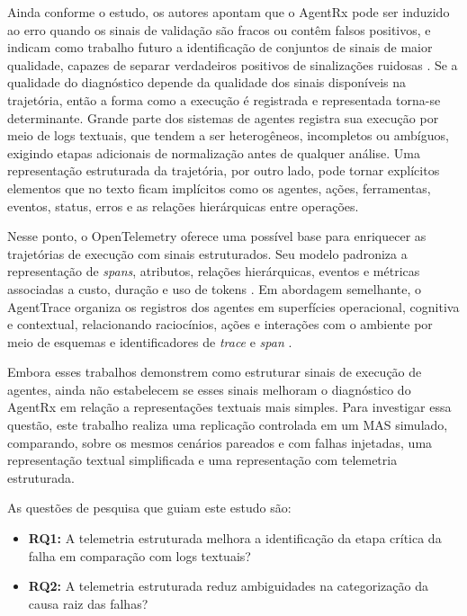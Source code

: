 \documentclass[sigconf]{acmart}
\begin{document}
Ainda conforme o estudo, os autores apontam que o AgentRx pode ser induzido ao erro quando os sinais de validação são
fracos ou contêm falsos positivos, e indicam como trabalho futuro a identificação de conjuntos de sinais de maior
qualidade, capazes de separar verdadeiros positivos de sinalizações ruidosas \cite{barke2026agentrx}. Se a qualidade do
diagnóstico depende da qualidade dos sinais disponíveis na trajetória, então a forma como a execução é registrada e
representada torna-se determinante. Grande parte dos sistemas de agentes registra sua execução por meio de logs
textuais, que tendem a ser heterogêneos, incompletos ou ambíguos, exigindo etapas adicionais de normalização antes de
qualquer análise. Uma representação estruturada da trajetória, por outro lado, pode tornar explícitos elementos que no
texto ficam implícitos como os agentes, ações, ferramentas, eventos, status, erros e as relações hierárquicas entre
operações.

Nesse ponto, o OpenTelemetry oferece uma possível base para enriquecer as trajetórias de execução com sinais
estruturados. Seu modelo padroniza a representação de \textit{spans}, atributos, relações hierárquicas, eventos e
métricas associadas a custo, duração e uso de tokens \cite{ibm_opentelemetry}. Em abordagem semelhante, o AgentTrace
organiza os registros dos agentes em superfícies operacional, cognitiva e contextual, relacionando raciocínios, ações e
interações com o ambiente por meio de esquemas e identificadores de \textit{trace} e \textit{span}
\cite{alsayyad2026agenttrace}.

Embora esses trabalhos demonstrem como estruturar sinais de execução de agentes, ainda não estabelecem se esses sinais
melhoram o diagnóstico do AgentRx em relação a representações textuais mais simples. Para investigar essa questão, este
trabalho realiza uma replicação controlada em um MAS simulado, comparando, sobre os mesmos cenários pareados e com
falhas injetadas, uma representação textual simplificada e uma representação com telemetria estruturada.

As questões de pesquisa que guiam este estudo são:
\begin{itemize}
	\item \textbf{RQ1:} A telemetria estruturada melhora a identificação da etapa crítica da falha em comparação com logs textuais?
	\item \textbf{RQ2:} A telemetria estruturada reduz ambiguidades na categorização da causa raiz das falhas?
\end{itemize}
\end{document}
